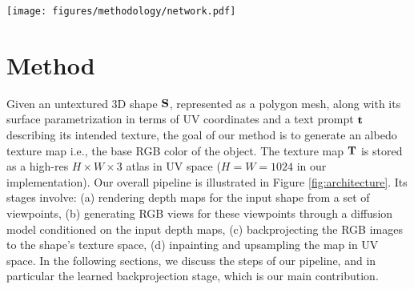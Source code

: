 
\begin{figure*}[!t]
    \texttt{[image: figures/methodology/network.pdf]}
    \vspace*{-2mm}
    \caption{(Top) The\method, pipeline utilizes depth images and a text prompt to generate a number of candidate views (RGB images) for a given shape. The views are aggregated through a learned backprojection module that incorporates geometric information, such as 3D location, normals, angles between normals, and view vectors, as well as geodesic neighborhood information (bottom right) of shape points corresponding to pixels of the generated RGB images.
 The backprojection module integrates several cross-attention blocks
 (bottom left) used
 to infer texel features and colors from the appearance and geometric information gathered from relevant, non-background pixels across all
 available views.  
 As some texels may remain uncolored, an inpainting and high-definition (HD) module is applied to refine the texture map following Paint3D \cite{Zeng:2024:Paint3D}. }
    \label{fig:architecture}
    \vspace*{-5mm}
\end{figure*}

\section{Method}

Given an untextured 3D shape $\mathbf{S}$, represented as a polygon mesh, along with its surface parametrization in terms of UV coordinates and a text prompt $\mathbf{t}$ describing its intended texture,
the goal of our method is to generate an albedo texture map i.e., the base RGB color of the object. The texture map
$\mathbf{T}$
is 
 stored as a high-res $H \times W \times 3$ atlas in UV space
 ($H=W=1024$ in our implementation). Our overall pipeline is illustrated in Figure \ref{fig:architecture}. Its stages involve: (a) rendering depth maps for the input shape from a set of viewpoints, (b) generating RGB views for these viewpoints through a diffusion model  conditioned on the input depth maps, (c) backprojecting the RGB images to the shape's texture space, (d) inpainting and upsampling the map in UV space. 
  In the following sections, we discuss the steps of our pipeline, and in particular the learned backprojection stage, which is our main contribution. 

